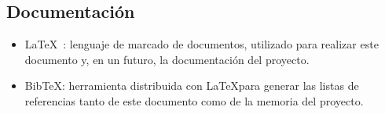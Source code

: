 \subsection{Documentación}
\label{sec:documentacion}

\begin{itemize}
\item \LaTeX~\cite{latex}: lenguaje de marcado de documentos, utilizado para
  realizar este documento y, en un futuro, la documentación del proyecto.

\item Bib\TeX: herramienta distribuida con \LaTeX para generar las listas de
  referencias tanto de este documento como de la memoria del proyecto.
\end{itemize}








